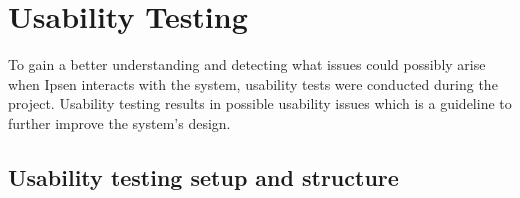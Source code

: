 
\section{Usability Testing}

To gain a better understanding and detecting what issues could possibly arise when Ipsen interacts with the system, usability tests were conducted during the project. 
Usability testing results in possible usability issues which is a guideline to further improve the system's design. 

\subsection{Usability testing setup and structure}



	 
  





